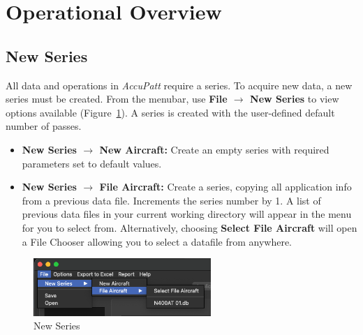 \documentclass[10pt,letterpaper,titlepage]{article}
\begin{document}
    \section{Operational Overview}
    
    \subsection{New Series}
    All data and operations in \textit{AccuPatt} require a series. To acquire new data, a new series must be created. From the menubar, use \textbf{File $\rightarrow$ New Series} to view options available (Figure~\ref{fig:new_series}). A series is created with the user-defined default number of passes.
    \begin{itemize}
        \item \textbf{New Series $\rightarrow$ New Aircraft:} Create an empty series with required parameters set to default values.
        \item \textbf{New Series $\rightarrow$ File Aircraft:} Create a series, copying all application info from a previous data file. Increments the series number by 1. A list of previous data files in your current working directory will appear in the menu for you to select from. Alternatively, choosing \textbf{Select File Aircraft} will open a File Chooser allowing you to select a datafile from anywhere.
    \end{itemize}
    \begin{figure}[hb]
        \centering
        \includegraphics[width=0.6\textwidth]{new_series}
        \caption{New Series}
        \label{fig:new_series}
    \end{figure}
    
\end{document}
